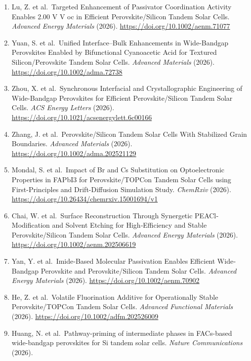 \documentclass[
  11pt,
]{article}
\begin{document}
\begin{enumerate}
  for controllable surface energetics of photovoltaic perovskites.
  \emph{Science Advances} (2026).
  \url{https://doi.org/10.1126/sciadv.aec4431}
\item
  Lu, Z. et al.~Targeted Enhancement of Passivator Coordination Activity
  Enables 2.00 V V oc in Efficient Perovskite/Silicon Tandem Solar
  Cells. \emph{Advanced Energy Materials} (2026).
  \url{https://doi.org/10.1002/aenm.71077}
\item
  Yuan, S. et al.~Unified Interface--Bulk Enhancements in Wide‐Bandgap
  Perovskites Enabled by Bifunctional Cyanoacetic Acid for Textured
  Silicon/Perovskite Tandem Solar Cells. \emph{Advanced Materials}
  (2026). \url{https://doi.org/10.1002/adma.72738}
\item
  Zhou, X. et al.~Synchronous Interfacial and Crystallographic
  Engineering of Wide-Bandgap Perovskites for Efficient
  Perovskite/Silicon Tandem Solar Cells. \emph{ACS Energy Letters}
  (2026). \url{https://doi.org/10.1021/acsenergylett.6c00166}
\item
  Zhang, J. et al.~Perovskite/Silicon Tandem Solar Cells With Stabilized
  Grain Boundaries. \emph{Advanced Materials} (2026).
  \url{https://doi.org/10.1002/adma.202521129}
\item
  Mondal, S. et al.~Impact of Br and Cs Substitution on Optoelectronic
  Properties in FAPbI3 for Perovskite/TOPCon Tandem Solar Cells using
  First-Principles and Drift-Diffusion Simulation Study. \emph{ChemRxiv}
  (2026). \url{https://doi.org/10.26434/chemrxiv.15001694/v1}
\item
  Chai, W. et al.~Surface Reconstruction Through Synergetic
  PEACl‐Modification and Solvent Etching for High‐Efficiency and Stable
  Perovskite/Silicon Tandem Solar Cells. \emph{Advanced Energy
  Materials} (2026). \url{https://doi.org/10.1002/aenm.202506619}
\item
  Yan, Y. et al.~Imide‐Based Molecular Passivation Enables Efficient
  Wide‐Bandgap Perovskite and Perovskite/Silicon Tandem Solar Cells.
  \emph{Advanced Energy Materials} (2026).
  \url{https://doi.org/10.1002/aenm.70902}
\item
  He, Z. et al.~Volatile Fluorination Additive for Operationally Stable
  Perovskite/TOPCon Tandem Solar Cells. \emph{Advanced Functional
  Materials} (2026). \url{https://doi.org/10.1002/adfm.202526009}
\item
  Huang, N. et al.~Pathway-priming of intermediate phases in FACs-based
  wide-bandgap perovskites for Si tandem solar cells. \emph{Nature
  Communications} (2026).

\end{enumerate}
\end{document}

